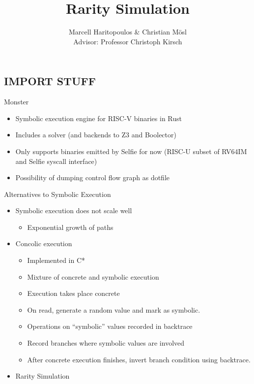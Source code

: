 \documentclass[10pt]{beamer}
\title{Rarity Simulation}
\date{}
\author{Marcell Haritopoulos \& Christian Mösl \\
Advisor: Professor Christoph Kirsch}
\begin{document}
\maketitle

\begin{frame}
    \tableofcontents
\end{frame}

\begin{frame}
    \section{IMPORT STUFF}
\end{frame}

\begin{frame}{Monster}
    \begin{itemize}
		\item Symbolic execution engine for  RISC-V binaries in Rust
		\item Includes a solver (and backends to Z3 and Boolector)
		\item Only supports binaries emitted by Selfie for now (RISC-U subset of RV64IM and Selfie syscall interface)
		\item Possibility of dumping control flow graph as dotfile
    \end{itemize}
\end{frame}

\begin{frame}{Alternatives to Symbolic Execution}
	\begin{itemize}
		\item Symbolic execution does not scale well
			\begin{itemize}
				\item Exponential growth of paths
			\end{itemize}
		\item Concolic execution
			\begin{itemize}
				\item Implemented in C*
				\item Mixture of concrete and symbolic execution
				\item Execution takes place concrete
				\item On read, generate a random value and mark as symbolic.
				\item Operations on \enquote{symbolic} values recorded in backtrace
				\item Record branches where symbolic values are involved
				\item After concrete execution finishes, invert branch condition using backtrace.
			\end{itemize}
		\item Rarity Simulation
	\end{itemize}
\end{frame}
\end{document}
